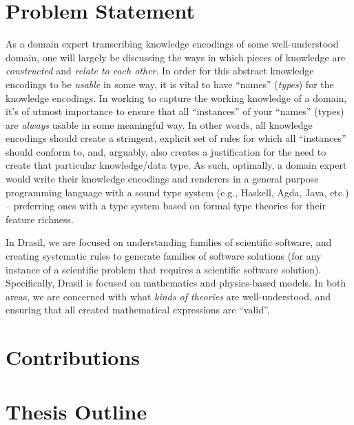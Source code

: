 

\section{Problem Statement}


As a domain expert transcribing knowledge encodings of some well-understood
domain, one will largely be discussing the ways in which pieces of knowledge are
\textit{constructed} and \textit{relate to each other}. In order for this
abstract knowledge encodings to be \textit{usable} in some way, it is vital to
have ``names'' (\textit{types}) for the knowledge encodings. In working to
capture the working knowledge of a domain, it's of utmost importance to ensure
that all ``instances'' of your ``names'' (types) are \textit{always} usable in
some meaningful way. In other words, all knowledge encodings should create a
stringent, explicit set of rules for which all ``instances'' should conform to,
and, arguably, also creates a justification for the need to create that
particular knowledge/data type. As such, optimally, a domain expert would write
their knowledge encodings and renderers in a general purpose programming
language with a sound type system (e.g., Haskell, Agda, Java, etc.) --
preferring ones with a type system based on formal type theories for their
feature richness.

In Drasil, we are focused on understanding families of scientific software, and
creating systematic rules to generate families of software solutions (for any
instance of a scientific problem that requires a scientific software solution).
Specifically, Drasil is focused on mathematics and physics-based models. In both
areas, we are concerned with what \textit{kinds of theories} are
well-understood, and ensuring that all created mathematical expressions are
``valid''. 

\section{Contributions}


\section{Thesis Outline}

